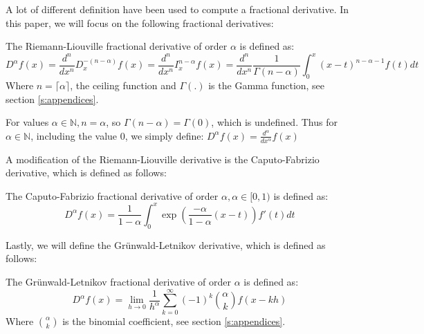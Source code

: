 A lot of different definition have been used to compute a fractional derivative. In this paper, we will focus on the following fractional derivatives:
\begin{definition}
    The Riemann-Liouville fractional derivative of order \(\alpha\) is defined as:
    \begin{equation}
        D^{\alpha} f(x) =  \frac{d^{n}}{dx^{n}} D_{x}^{-(n - \alpha)} f(x) = \frac{d^{n}}{dx^{n}} I_{x}^{n - \alpha} f(x) = \frac{d^n}{dx^n} \frac{1}{\Gamma(n -\alpha)}  \int_{0}^{x} (x-t)^{n - \alpha-1} f(t) dt
    \end{equation}
    Where \(n = \lceil \alpha \rceil\), the ceiling function and \(\Gamma(.)\) is the Gamma function, see section \autoref{s:appendices}.
    
    \begin{remark}\label{r: integer}
        For values \(\alpha \in \mathbb{N}, n = \alpha\), so \(\Gamma(n - \alpha) = \Gamma(0)\), which is undefined. Thus for \(\alpha \in \mathbb{N}\), including the value \(0\), we simply define: \(D^\alpha f(x) = \frac{d^\alpha}{dx^\alpha} f(x)\)
    \end{remark}
   
\end{definition}
A modification of the Riemann-Liouville derivative is the Caputo-Fabrizio derivative, which is defined as follows:
\begin{definition}\label{d: CF}
    The Caputo-Fabrizio fractional derivative of order \(\alpha, \alpha \in [0,1)\) is defined as:
    \begin{equation}
        D^{\alpha} f(x) = \frac{1}{1 - \alpha}  \int_{0}^{x} \exp(\frac{-\alpha}{1 - \alpha}(x-t)) f'(t) dt
    \end{equation}
    
    
\end{definition}

Lastly, we will define the Grünwald-Letnikov derivative, which is defined as follows:
\begin{definition}
    The Grünwald-Letnikov fractional derivative of order \(\alpha\) is defined as:
    \begin{equation}
        D^\alpha f(x) = \lim_{h \to 0} \frac{1}{h^\alpha} \sum_{k=0}^\infty (-1)^k \binom{\alpha}{k} f(x - k h)
    \end{equation}
   Where \(\binom{\alpha}{k}\) is the binomial coefficient, see section \autoref{s:appendices}.
\end{definition}

